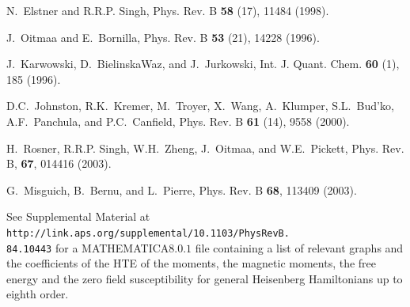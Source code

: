 \documentclass[aps,twocolumn,groupedaddress]{revtex4}
\begin{document}
\begin{thebibliography}{10}
N.~Elstner and R.R.P. Singh,
Phys. Rev. B {\bf 58} (17), 11484 (1998).

J.~Oitmaa and E.~Bornilla,
Phys. Rev. B {\bf 53} (21), 14228 (1996).

J.~Karwowski, D.~BielinskaWaz, and J.~Jurkowski,
Int. J. Quant. Chem. {\bf 60} (1), 185 (1996).

D.C.~Johnston, R.K.~Kremer, M.~Troyer, X.~Wang, A.~Klumper, S.L.~Bud'ko, A.F.~Panchula,
  and P.C.~Canfield,
Phys. Rev. B {\bf 61} (14), 9558 (2000).

H.~Rosner, R.R.P. Singh, W.H.~Zheng, J.~Oitmaa, and W.E.~Pickett,
{{Phys. Rev. B}}, {\bf 67}, 014416 (2003).

G.~Misguich, B.~Bernu, and L.~Pierre,
Phys. Rev. B {\bf 68}, 113409 (2003).




See Supplemental Material at\\ {\tt http://link.aps.org/supplemental/10.1103/PhysRevB.\\
84.10443}
for a MATHEMATICA$8.0.1$ file
containing a list of relevant graphs and the coefficients of
the HTE of the moments, the magnetic moments, the free energy and the
zero field susceptibility for general Heisenberg Hamiltonians up
to eighth order.


\end{thebibliography}
\end{document}
